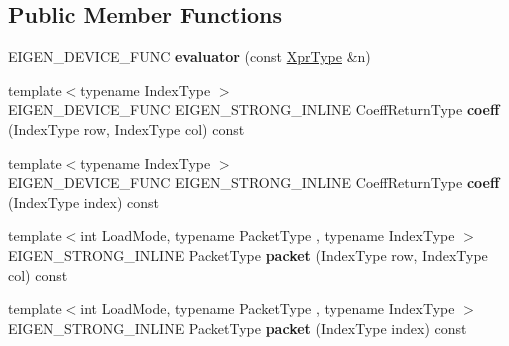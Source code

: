 \subsection*{Public Member Functions}
\begin{DoxyCompactItemize}
\item 
\mbox{\label{struct_eigen_1_1internal_1_1evaluator_3_01_cwise_nullary_op_3_01_nullary_op_00_01_plain_object_type_01_4_01_4_aaf586010a219c03f50009e770d6af28e}} 
E\+I\+G\+E\+N\+\_\+\+D\+E\+V\+I\+C\+E\+\_\+\+F\+U\+NC {\bfseries evaluator} (const \mbox{\hyperlink{class_eigen_1_1_cwise_nullary_op}{Xpr\+Type}} \&n)
\item 
\mbox{\label{struct_eigen_1_1internal_1_1evaluator_3_01_cwise_nullary_op_3_01_nullary_op_00_01_plain_object_type_01_4_01_4_aa8a593e05cf477e1c3e92f4e2975c46b}} 
{\footnotesize template$<$typename Index\+Type $>$ }\\E\+I\+G\+E\+N\+\_\+\+D\+E\+V\+I\+C\+E\+\_\+\+F\+U\+NC E\+I\+G\+E\+N\+\_\+\+S\+T\+R\+O\+N\+G\+\_\+\+I\+N\+L\+I\+NE Coeff\+Return\+Type {\bfseries coeff} (Index\+Type row, Index\+Type col) const
\item 
\mbox{\label{struct_eigen_1_1internal_1_1evaluator_3_01_cwise_nullary_op_3_01_nullary_op_00_01_plain_object_type_01_4_01_4_a7ec7e36414abf82667fe8c16f97ca204}} 
{\footnotesize template$<$typename Index\+Type $>$ }\\E\+I\+G\+E\+N\+\_\+\+D\+E\+V\+I\+C\+E\+\_\+\+F\+U\+NC E\+I\+G\+E\+N\+\_\+\+S\+T\+R\+O\+N\+G\+\_\+\+I\+N\+L\+I\+NE Coeff\+Return\+Type {\bfseries coeff} (Index\+Type index) const
\item 
\mbox{\label{struct_eigen_1_1internal_1_1evaluator_3_01_cwise_nullary_op_3_01_nullary_op_00_01_plain_object_type_01_4_01_4_af5154bf27bd13badf0674f8356068f9e}} 
{\footnotesize template$<$int Load\+Mode, typename Packet\+Type , typename Index\+Type $>$ }\\E\+I\+G\+E\+N\+\_\+\+S\+T\+R\+O\+N\+G\+\_\+\+I\+N\+L\+I\+NE Packet\+Type {\bfseries packet} (Index\+Type row, Index\+Type col) const
\item 
\mbox{\label{struct_eigen_1_1internal_1_1evaluator_3_01_cwise_nullary_op_3_01_nullary_op_00_01_plain_object_type_01_4_01_4_a8d21e39c3aee922604f373684dc8efde}} 
{\footnotesize template$<$int Load\+Mode, typename Packet\+Type , typename Index\+Type $>$ }\\E\+I\+G\+E\+N\+\_\+\+S\+T\+R\+O\+N\+G\+\_\+\+I\+N\+L\+I\+NE Packet\+Type {\bfseries packet} (Index\+Type index) const
\end{DoxyCompactItemize}
